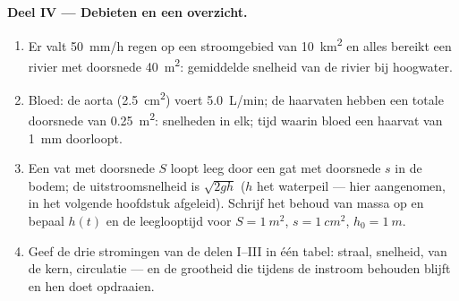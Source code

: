 \begin{problem}
\medskip
\noindent\textbf{Deel IV --- Debieten en een overzicht.}
\begin{enumerate}[resume]
  \item Er valt \qty{50}{mm/h} regen op een stroomgebied van \qty{10}{km^2}
        en alles bereikt een rivier met doorsnede \qty{40}{m^2}: gemiddelde
        snelheid van de rivier bij hoogwater.
  \item Bloed: de aorta (\qty{2.5}{cm^2}) voert \qty{5.0}{L/min}; de
        haarvaten hebben een totale doorsnede van \qty{0.25}{m^2}: snelheden
        in elk; tijd waarin bloed een haarvat van \qty{1}{mm} doorloopt.
  \item Een vat met doorsnede $S$ loopt leeg door een gat met doorsnede $s$
        in de bodem; de uitstroomsnelheid is $\sqrt{2gh}$ ($h$ het waterpeil
        --- hier aangenomen, in het volgende hoofdstuk afgeleid). Schrijf
        het behoud van massa op en bepaal $h(t)$ en de leegloop\-tijd voor
        $S = \qty{1}{m^2}$, $s = \qty{1}{cm^2}$, $h_0 = \qty{1}{m}$.
  \item Geef de drie stromingen van de delen I--III in één tabel: straal,
        snelheid,  van de kern, circulatie --- en de grootheid
        die tijdens de instroom behouden blijft en hen doet opdraaien.
\end{enumerate}
\end{problem}

